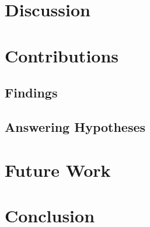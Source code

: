 \section{Discussion}      

\section{Contributions}      

\subsection{Findings}

\subsection{Answering Hypotheses}


\section{Future Work}      


\section{Conclusion}      


